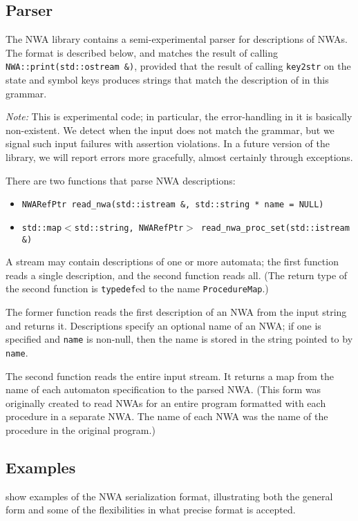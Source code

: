 \subsection{Parser}
\label{Se:parser}

The NWA library contains a semi-experimental parser for descriptions of
NWAs. The format is described below, and matches the result of calling
\texttt{NWA::print(std::ostream \&)}, provided that the result of
calling \texttt{key2str} on the state and symbol keys produces strings
that match the description of  in this grammar.

\textsl{Note:} This is experimental code; in particular, the
error-handling in it is basically non-existent. We detect when the
input does not match the grammar, but we signal such input failures
with assertion violations. In a future version of the library, we will
report errors more gracefully, almost certainly through exceptions.

There are two functions that parse NWA descriptions:
\begin{itemize}
  \item\texttt{NWARefPtr read\_nwa(std::istream \&, std::string * name = NULL)}
  \item\texttt{std::map$<$std::string, NWARefPtr$>$ read\_nwa\_proc\_set(std::istream \&)}
\end{itemize}
A stream may contain descriptions of one or more automata; the first
function reads a single description, and the second function reads all.  (The return
type of the second function is \texttt{typedef}ed to the name
\texttt{ProcedureMap}.)

The former function reads the first description of an NWA from the
input string and returns it. Descriptions specify an optional name of
an NWA; if one is specified and \texttt{name} is non-null, then the
name is stored in the string pointed to by \texttt{name}.

The second function reads the entire input stream. It returns a map
from the name of each automaton specification to the parsed NWA. (This
form was originally created to read NWAs for an entire program formatted with
each procedure in a separate NWA. The name of each NWA was the name of
the procedure in the original program.)

\subsection{Examples}

 show examples of the NWA serialization format, illustrating
both the general form and some of the flexibilities in what precise
format is accepted.

